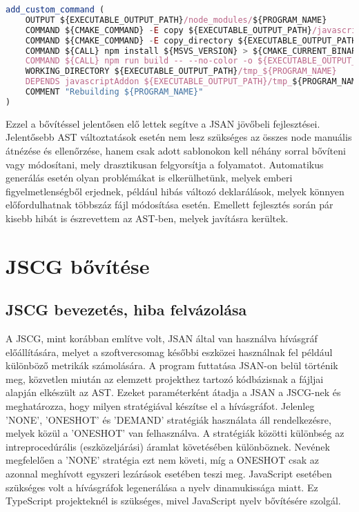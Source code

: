 \begin{lstlisting}[caption={JSAN Cmake utasítások},label={lst:jsancmake}, language={JavaScript}]
add_custom_command (
    OUTPUT ${EXECUTABLE_OUTPUT_PATH}/node_modules/${PROGRAM_NAME}
    COMMAND ${CMAKE_COMMAND} -E copy ${EXECUTABLE_OUTPUT_PATH}/javascriptAddon.node ${EXECUTABLE_OUTPUT_PATH}/tmp_${PROGRAM_NAME}/
    COMMAND ${CMAKE_COMMAND} -E copy_directory ${EXECUTABLE_OUTPUT_PATH}/../lib/javascript/addon/ast ${EXECUTABLE_OUTPUT_PATH}/tmp_${PROGRAM_NAME}/src/ast/
    COMMAND ${CALL} npm install ${MSVS_VERSION} > ${CMAKE_CURRENT_BINARY_DIR}/${PROGRAM_NAME}-npm-install.log 2>&1
    COMMAND ${CALL} npm run build -- --no-color -o ${EXECUTABLE_OUTPUT_PATH}/node_modules/${PROGRAM_NAME} > ${CMAKE_CURRENT_BINARY_DIR}/${PROGRAM_NAME}-npm-build.log 2>&1
    WORKING_DIRECTORY ${EXECUTABLE_OUTPUT_PATH}/tmp_${PROGRAM_NAME}
    DEPENDS javascriptAddon ${EXECUTABLE_OUTPUT_PATH}/tmp_${PROGRAM_NAME}
    COMMENT "Rebuilding ${PROGRAM_NAME}"
)
\end{lstlisting}

Ezzel a bővítéssel jelentősen elő lettek segítve a JSAN jövőbeli fejlesztései. Jelentősebb AST változtatások esetén nem lesz szükséges az összes node manuális átnézése és ellenőrzése, hanem csak adott sablonokon kell néhány sorral bővíteni vagy módosítani, mely drasztikusan felgyorsítja a folyamatot. Automatikus generálás esetén olyan problémákat is elkerülhetünk, melyek emberi figyelmetlenségből erjednek, például hibás változó deklarálások, melyek könnyen előfordulhatnak többszáz fájl módosítása esetén. Emellett fejlesztés során pár kisebb hibát is észrevettem az AST-ben, melyek javításra kerültek. 

\section{JSCG bővítése}

\subsection{JSCG bevezetés, hiba felvázolása}
A JSCG, mint korábban említve volt, JSAN által van használva hívásgráf előállítására, melyet a szoftvercsomag későbbi eszközei használnak fel például különböző metrikák számolására. A program futtatása JSAN-on belül történik meg, közvetlen miután az elemzett projekthez tartozó kódbázisnak a fájljai alapján elkészült az AST. Ezeket paraméterként átadja a JSAN a JSCG-nek és meghatározza, hogy milyen stratégiával készítse el a hívásgráfot. Jelenleg 'NONE', 'ONESHOT' és 'DEMAND' stratégiák használata áll rendelkezésre, melyek közül a 'ONESHOT' van felhasználva. A stratégiák közötti különbség az intreprocedúrális (eszközeljárási) áramlat követésében különböznek. Nevének megfelelően a 'NONE' stratégia ezt nem követi, míg a ONESHOT csak az azonnal meghívott egyszeri lezárások esetében teszi meg.
JavaScript esetében szükséges volt a hívásgráfok legenerálása a nyelv dinamukissága miatt\cite{feldthaus2013efficient}. Ez TypeScript projekteknél is szükséges, mivel JavaScript nyelv bővítésére szolgál.

